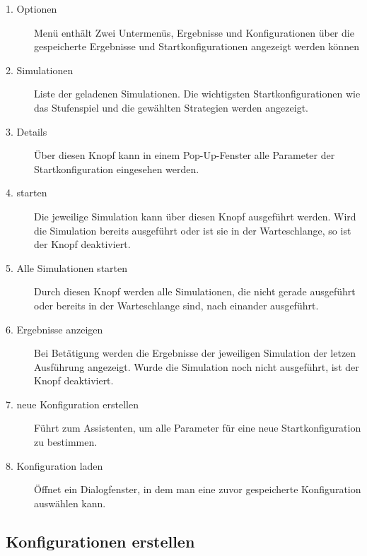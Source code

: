 \begin{description}


\item[1. Optionen] Menü enthält Zwei Untermenüs, Ergebnisse und Konfigurationen über die gespeicherte Ergebnisse und Startkonfigurationen angezeigt werden können

\item[2. Simulationen] Liste der geladenen Simulationen. Die wichtigsten Startkonfigurationen wie das Stufenspiel und die gewählten Strategien werden angezeigt.

\item[3. Details] Über diesen Knopf kann in einem Pop-Up-Fenster alle Parameter der Startkonfiguration eingesehen werden.

\item[4. starten] Die jeweilige Simulation kann über diesen Knopf ausgeführt werden. Wird die Simulation bereits ausgeführt oder ist sie in der Warteschlange, so ist der Knopf deaktiviert.

\item[5. Alle Simulationen starten] Durch diesen Knopf werden alle Simulationen, die nicht gerade ausgeführt oder bereits in der Warteschlange sind, nach einander ausgeführt. 

\item[6. Ergebnisse anzeigen] Bei Betätigung werden die Ergebnisse der jeweiligen Simulation der letzen Ausführung angezeigt. Wurde die Simulation noch nicht ausgeführt, ist der Knopf deaktiviert.

\item[7. neue Konfiguration erstellen] Führt zum Assistenten, um alle Parameter für eine neue Startkonfiguration zu bestimmen.

\item[8. Konfiguration laden] Öffnet ein Dialogfenster, in dem man eine zuvor gespeicherte Konfiguration auswählen kann.

\end{description}


\subsection{Konfigurationen erstellen}

